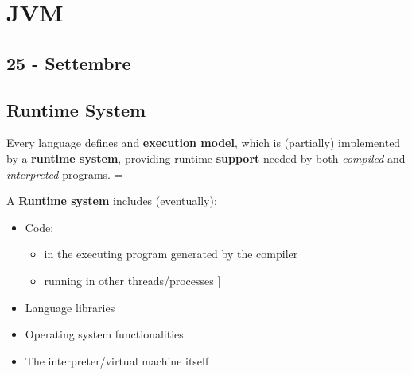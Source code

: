 \chapter{JVM}
\section*{25 - Settembre}
\section{Runtime System}
Every language defines and \textbf{execution model}, which is (partially) implemented by a \textbf{runtime system},
providing runtime \textbf{support} needed by both \textit{compiled} and \textit{interpreted} programs.
\parskip = \baselineskip

A \textbf{Runtime system} includes (eventually):
\begin{itemize}
    \item Code:
    \begin{itemize}
        \item in the executing program generated by the compiler
        \item running in other threads/processes ]
    \end{itemize}
    \item Language libraries
    \item Operating system functionalities
    \item The interpreter/virtual machine itself
\end{itemize}



